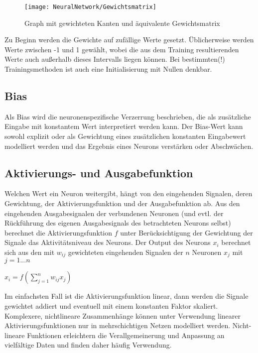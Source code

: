 \begin{figure}[H]
	\begin{center}
		\texttt{[image: NeuralNetwork/Gewichtsmatrix]}
		\caption{Graph mit gewichteten Kanten und äquivalente Gewichtsmatrix} 
		\label{Gewichtsmatrix}
	\end{center}
\end{figure}

Zu Beginn werden die Gewichte auf zufällige Werte gesetzt. Üblicherweise werden Werte zwischen -1 und 1 gewählt, 
wobei die aus dem Training resultierenden Werte auch außerhalb dieses Intervalls liegen können. \cite{Moeser:2018} 
Bei bestimmten(!) Trainingsmethoden ist auch eine Initialisierung mit Nullen denkbar. \cite{Kononenko:2007}

\subsection{Bias}

Als Bias wird die neuronenspezifische Verzerrung beschrieben, die als zusätzliche Eingabe
mit konstantem Wert interpretiert werden kann. Der Bias-Wert kann sowohl explizit oder
als Gewichtung eines zusätzlichen konstanten Eingabewert modelliert werden und das
Ergebnis eines Neurons verstärken oder Abschwächen. \cite{Ziegler:2015}

\subsection{Aktivierungs- und Ausgabefunktion} \label{Aktivierungs- und Ausgabefunktion} 
Welchen Wert ein Neuron weitergibt, hängt von den eingehenden Signalen, deren Gewichtung, 
der Aktivierungsfunktion und der Ausgabefunktion ab. Aus den eingehenden Ausgabesignalen 
der verbundenen Neuronen (und evtl. der Rückführung des eigenen Ausgabesignals des betrachteten Neurons selbst) 
berechnet die Aktivierungsfunktion $f$ unter Berücksichtigung der Gewichtung der Signale das 
Aktivitätsniveau des Neurons. \cite{Kruse:2015} 
Der Output des Neurons $x_i$ berechnet sich aus den mit $w_{ij}$ gewichteten eingehenden Signalen 
der $n$ Neuronen $x_j$ mit $j = 1...n$ \\

\begin{center}
$x_i = f(\sum \limits_{j=1}^n w_{ij} x_j)$
\end{center}

Im einfachsten Fall ist die Aktivierungsfunktion linear, dann werden die Signale gewichtet addiert und eventuell mit einem 
konstanten Faktor skaliert. Komplexere, nichtlineare Zusammenhänge können unter Verwendung linearer Aktivierungsfunktionen 
nur in mehrschichtigen Netzen modelliert werden.\cite{Kononenko:2007} Nicht-lineare Funktionen erleichtern die Verallgemeinerung 
und Anpassung an vielfältige Daten und finden daher häufig Verwendung. \cite{Gupta:2020b}

